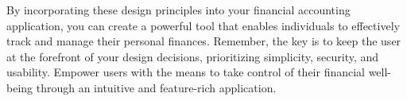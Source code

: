 By incorporating these design principles into your financial accounting application, you can create a powerful 
tool that enables individuals to effectively track and manage their personal finances. Remember, the key is to 
keep the user at the forefront of your design decisions, prioritizing simplicity, security, and usability. 
Empower users with the means to take control of their financial well-being through an intuitive and 
feature-rich application.

